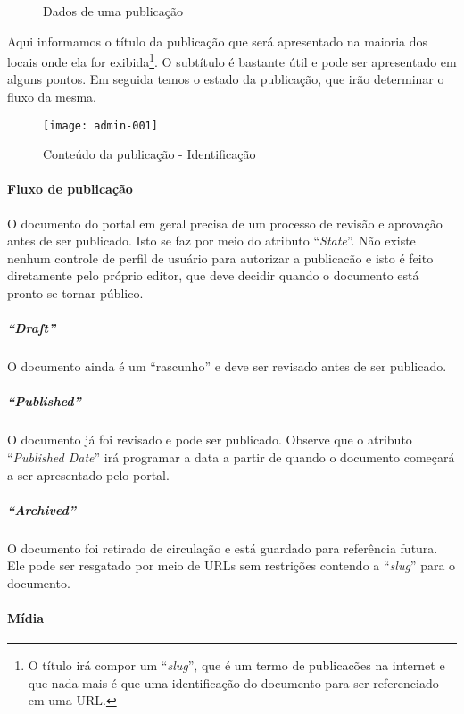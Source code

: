 \begin{figure}[!ht]
    \centering
    \caption{Dados de uma publicação}\label{RS0006:fig:admin}
\end{figure}

Aqui informamos o título da publicação que será apresentado na maioria dos locais onde ela for exibida\footnote{O título irá compor um ``\textit{slug}'', que é um termo de publicacões na internet e que nada mais é que uma identificação do documento para ser referenciado em uma \gls{URL}.}. O subtítulo é bastante útil e pode ser apresentado em alguns pontos. Em seguida temos o estado da publicação, que irão determinar o fluxo da mesma.

\begin{figure}[!ht]
    \centering
    \texttt{[image: admin-001]}
    \caption{Conteúdo da publicação - Identificação}\label{RS0006:fig:admin-001}
\end{figure}

\paragraph{Fluxo de publicação}

O documento do portal em geral precisa de um processo de revisão e aprovação antes de ser publicado. Isto se faz por meio do atributo ``\textit{State}''. Não existe nenhum controle de perfil de usuário para autorizar a publicacão e isto é feito diretamente pelo próprio editor, que deve decidir quando o documento está pronto se tornar público.

\subparagraph{``Draft''}

O documento ainda é um ``rascunho'' e deve ser revisado antes de ser publicado.

\subparagraph{``Published''}

O documento já foi revisado e pode ser publicado. Observe que o atributo ``\textit{Published Date}'' irá programar a data a partir de quando o documento começará a ser apresentado pelo portal.

\subparagraph{``Archived''}

O documento foi retirado de circulação e está guardado para referência futura. Ele pode ser resgatado por meio de \glspl{URL} sem restrições contendo a ``\textit{slug}'' para o documento.

\paragraph{Mídia}

